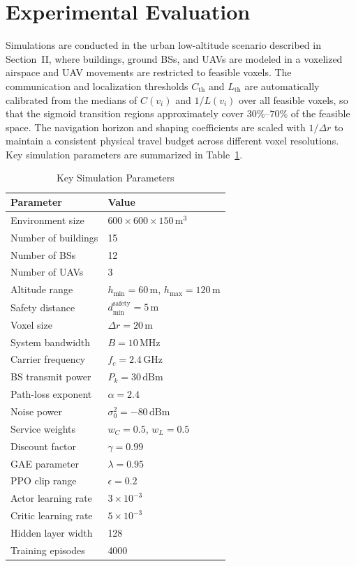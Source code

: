 \documentclass[lettersize,journal]{IEEEtran}
\begin{document}
\section{Experimental Evaluation}

Simulations are conducted in the urban low-altitude scenario described in Section~II, where buildings, ground BSs, and UAVs are modeled in a voxelized airspace and UAV movements are restricted to feasible voxels. The communication and localization thresholds $C_{\mathrm{th}}$ and $L_{\mathrm{th}}$ are automatically calibrated from the medians of $C(v_i)$ and $1/L(v_i)$ over all feasible voxels, so that the sigmoid transition regions approximately cover $30\%$--$70\%$ of the feasible space. The navigation horizon and shaping coefficients are scaled with $1/\Delta r$ to maintain a consistent physical travel budget across different voxel resolutions. Key simulation parameters are summarized in Table~\ref{tab:params}.

\begin{table}[t]
\centering
\caption{Key Simulation Parameters}
\label{tab:params}
\scriptsize
\begin{tabular}{l|l}
\hline
\textbf{Parameter} & \textbf{Value} \\
\hline
Environment size & $600\times600\times150\,\mathrm{m}^3$ \\
Number of buildings & 15 \\
Number of BSs & 12 \\
Number of UAVs & 3 \\
Altitude range & $h_{\min}=60\,\mathrm{m}$, $h_{\max}=120\,\mathrm{m}$ \\
Safety distance & $d_{\min}^{\mathrm{safety}}=5\,\mathrm{m}$ \\
Voxel size & $\Delta r=20\,\mathrm{m}$ \\
System bandwidth & $B=10\,\mathrm{MHz}$ \\
Carrier frequency & $f_c=2.4\,\mathrm{GHz}$ \\
BS transmit power & $P_k=30\,\mathrm{dBm}$ \\
Path-loss exponent & $\alpha=2.4$ \\
Noise power & $\sigma_0^2=-80\,\mathrm{dBm}$ \\
Service weights & $w_C=0.5$, $w_L=0.5$ \\
Discount factor & $\gamma=0.99$ \\
GAE parameter & $\lambda=0.95$ \\
PPO clip range & $\epsilon=0.2$ \\
Actor learning rate & $3\times10^{-3}$ \\
Critic learning rate & $5\times10^{-3}$ \\
Hidden layer width & 128 \\
Training episodes & 4000 \\ 
\hline
\end{tabular}
\end{table}
\end{document}
